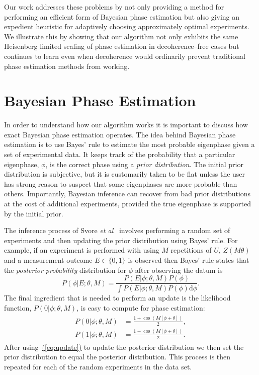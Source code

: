 \documentclass[aps,pra,amsmath,twocolumn,amssymb,superscriptaddress]{revtex4-1}
\newcommand{\eq}[1]{\hyperref[eq:#1]{(\ref*{eq:#1})}}
\newcommand{\etal}{\emph{et al}}
\begin{document}
Our work addresses these problems by not only providing a method for
performing an efficient form of Bayesian phase estimation but also giving an
expedient heuristic for adaptively choosing approximately optimal experiments.
We illustrate this by showing that our algorithm not only exhibits the same
Heisenberg limited scaling of phase estimation in decoherence--free cases but
continues to learn even when decoherence would ordinarily prevent traditional phase estimation
methods from working.

\section{Bayesian Phase Estimation}
\label{sec:bayesian-phase-est}

In order to understand how our algorithm works it is important to discuss how
exact Bayesian phase estimation operates. The idea behind Bayesian phase
estimation is to use Bayes' rule to estimate the most probable eigenphase given
a set of experimental data. It keeps track of the probability that a
particular eigenphase, $\phi$, is the correct phase using a \emph{prior
distribution}. The initial prior distribution is subjective, but it is
customarily taken to be flat unless the user has strong reason to suspect that
some eigenphases are more probable than others. Importantly, Bayesian inference
can recover from bad prior distributions at the cost of additional
experiments, provided the true eigenphase is supported by the initial prior.

The inference process of Svore \etal~\cite{SHF14} involves performing a random
set of experiments and then updating the prior distribution using Bayes' rule.
For example, if an experiment is performed with using $M$ repetitions of $U$,
$Z(M \theta)$ and a measurement outcome $E\in \{0,1\}$ is observed then Bayes'
rule states that the \emph{posterior probability} distribution for $\phi$
after observing the datum is
\begin{equation}
P(\phi|E;\theta,M) = \frac{P(E|\phi;\theta,M)P(\phi)}{\int P(E|\phi;\theta,M)P(\phi)\mathrm{d}{\phi}}.\label{eq:update}
\end{equation}
The final ingredient that is needed to perform an update is the likelihood function, $P(0|\phi;\theta,M)$, is easy to compute for phase estimation:
\begin{gather}
    \label{eq:likenodecohere}
    \begin{aligned}
        P(0|\phi;\theta,M) & = \frac{1+\cos(M[\phi +\theta])}{2},\\
        P(1|\phi;\theta,M) & = \frac{1-\cos(M[\phi +\theta])}{2}.
    \end{aligned}
\end{gather}
After using~\eq{update} to update the posterior distribution we then set the prior distribution to equal the posterior distribution.  This process is then repeated for each of the random experiments in the data set.
\end{document}

